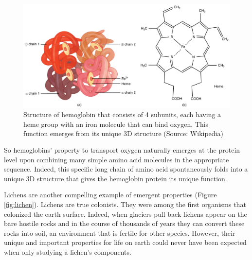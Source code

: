 \documentclass[
  11pt,
]{book}
\begin{document}
\begin{figure}

{\centering \includegraphics[width=1\linewidth]{./figs/hemoglobin} 

}

\caption{Structure of hemoglobin that consists of 4 subunits, each having a heme group with an iron molecule that can bind oxygen. This function emerges from its unique 3D structure (Source: Wikipedia)}\label{fig:hemoglobin}
\end{figure}

So hemoglobins' property to transport oxygen naturally emerges at the protein level upon combining many simple amino acid molecules in the appropriate sequence. Indeed, this specific long chain of amino acid spontaneously folds into a unique 3D structure that gives the hemoglobin protein its unique function.

Lichens are another compelling example of emergent properties (Figure \ref{fig:lichen}). Lichens are true colonists. They were among the first organisms that colonized the earth surface.
Indeed, when glaciers pull back lichens appear on the bare hostile rocks and in the course of thousands of years they can convert these rocks into soil, an environment that is fertile for other species. However, their unique and important properties for life on earth could never have been expected when only studying a lichen's components.
\end{document}
